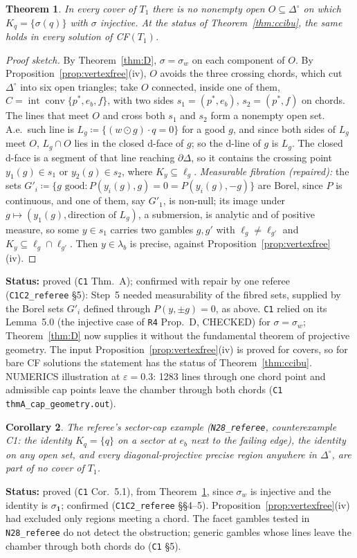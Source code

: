 \documentclass[11pt]{article}
\newtheorem{theorem}{Theorem}[section]
\newtheorem{corollary}[theorem]{Corollary}
\theoremstyle{definition}
\theoremstyle{remark}
\newcommand{\one}{\mathbf 1}
\newcommand{\Di}{\Delta^{\circ}}
\newcommand{\co}{\operatorname{conv}}
\newcommand{\src}[1]{\texttt{#1}}
\newcommand{\status}[1]{\par\smallskip\noindent\textbf{Status:} #1\par\smallskip}
\begin{document}
\begin{theorem}\label{thm:A}
In every cover of $T_1$ there is no nonempty open $O\subseteq\Di$ on which $K_q=\{\sigma(q)\}$ with $\sigma$ injective. At the status of Theorem~\ref{thm:ccibu}, the same holds in every solution of CF$(T_1)$.
\end{theorem}
\begin{proof}[Proof sketch]
By Theorem~\ref{thm:D}, $\sigma=\sigma_w$ on each component of $O$. By Proposition~\ref{prop:vertexfree}(iv), $O$ avoids the three crossing chords, which cut $\Di$ into six open triangles; take $O$ connected, inside one of them, $C=\operatorname{int}\co\{p^*,e_b,f\}$, with two sides $s_1=(p^*,e_b)$, $s_2=(p^*,f)$ on chords. The lines that meet $O$ and cross both $s_1$ and $s_2$ form a nonempty open set. A.e.\ such line is $L_g\coloneqq\{(w\odot g)\cdot q=0\}$ for a good $g$, and since both sides of $L_g$ meet $O$, $L_g\cap O$ lies in the closed d-face of $g$; so the d-line of $g$ is $L_g$. The closed d-face is a segment of that line reaching $\partial\Delta$, so it contains the crossing point $y_1(g)\in s_1$ or $y_2(g)\in s_2$, where $K_{y}\subseteq\ell_g$. \emph{Measurable fibration (repaired):} the sets $G'_i\coloneqq\{g \text{ good}:P(y_i(g),g)=0=P(y_i(g),-g)\}$ are Borel, since $P$ is continuous, and one of them, say $G'_1$, is non-null; its image under $g\mapsto(y_1(g),\text{direction of }L_g)$, a submersion, is analytic and of positive measure, so some $y\in s_1$ carries two gambles $g,g'$ with $\ell_g\ne\ell_{g'}$ and $K_y\subseteq\ell_g\cap\ell_{g'}$. Then $y\in\lambda_b$ is precise, against Proposition~\ref{prop:vertexfree}(iv).
\end{proof}
\status{proved (\src{C1} Thm.~A); confirmed with repair by one referee (\src{C1C2\_referee} \S5): Step~5 needed measurability of the fibred sets, supplied by the Borel sets $G'_i$ defined through $P(y,\pm g)=0$, as above. \src{C1} relied on its Lemma~5.0 (the injective case of \src{R4} Prop.~D, CHECKED) for $\sigma=\sigma_w$; Theorem~\ref{thm:D} now supplies it without the fundamental theorem of projective geometry. The input Proposition~\ref{prop:vertexfree}(iv) is proved for covers, so for bare CF solutions the statement has the status of Theorem~\ref{thm:ccibu}. NUMERICS illustration at $\varepsilon=0.3$: 1283 lines through one chord point and admissible cap points leave the chamber through both chords (\src{C1} \texttt{thmA\_cap\_geometry.out}).}

\begin{corollary}\label{cor:nocap}
The referee's sector-cap example (\src{N28\_referee}, counterexample C1: the identity $K_q=\{q\}$ on a sector at $e_b$ next to the failing edge), the identity on any open set, and every diagonal-projective precise region anywhere in $\Di$, are part of no cover of $T_1$.
\end{corollary}
\status{proved (\src{C1} Cor.~5.1), from Theorem~\ref{thm:A}, since $\sigma_w$ is injective and the identity is $\sigma_{\one}$; confirmed (\src{C1C2\_referee} \S\S4--5). Proposition~\ref{prop:vertexfree}(iv) had excluded only regions meeting a chord. The facet gambles tested in \src{N28\_referee} do not detect the obstruction; generic gambles whose lines leave the chamber through both chords do (\src{C1} \S5).}
\end{document}
